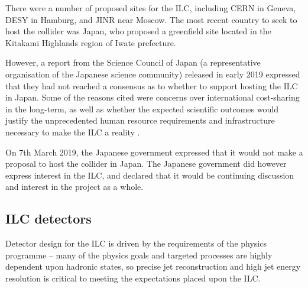 There were a number of proposed sites for the \acrshort{ILC}, including \acrshort{CERN} in Geneva, \acrshort{DESY} in Hamburg, and \acrshort{JINR} near Moscow. The most recent country to seek to host the collider was Japan, who proposed a greenfield site located in the Kitakami Highlands region of Iwate prefecture. 

However, a report from the Science Council of Japan (a representative organisation of the Japanese science community) released in early 2019 expressed that they had not reached a consensus as to whether to support hosting the ILC in Japan. Some  of the reasons cited were concerns over international cost-sharing in the long-term, as well as whether the expected scientific outcomes would justify the unprecedented human resource requirements and infrastructure necessary to make the \acrshort{ILC} a reality \cite{linearcolliders-scj-report}.

On 7th March 2019, the Japanese government expressed that it would not make a proposal to host the collider in Japan. The Japanese government did however express interest in the \acrshort{ILC}, and declared that it would be continuing discussion and interest in the project as a whole.



\subsection{ILC detectors}
Detector design for the \acrshort{ILC} is driven by the requirements of the physics programme -- many of the physics goals and targeted processes are highly dependent upon hadronic states, so precise jet reconstruction and high jet energy resolution is critical to meeting the expectations placed upon the \acrshort{ILC}. 

